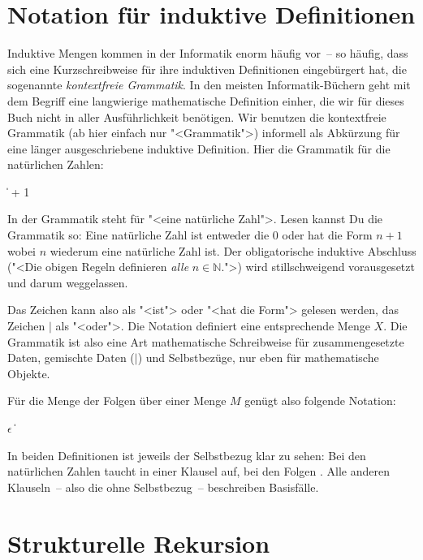 \section{Notation für induktive Definitionen}
\label{sec:grammatik}
Induktive Mengen kommen in der Informatik enorm häufig vor~-- so
häufig, dass sich eine Kurzschreibweise für ihre induktiven
Definitionen eingebürgert hat, die sogenannte \textit{kontextfreie
  Grammatik}.  In den
meisten Informatik-Büchern geht mit dem Begriff eine langwierige
mathematische Definition einher, die wir für dieses Buch nicht in aller
Ausführlichkeit benötigen.  Wir benutzen die kontextfreie Grammatik
(ab hier einfach nur "<Grammatik">) informell als Abkürzung für
eine länger ausgeschriebene induktive Definition.  Hier die Grammatik
für die natürlichen Zahlen:
%
\begin{grammar}
    \|  + 1
\end{grammar}
%
In der Grammatik steht  für "<eine natürliche
Zahl">.  Lesen kannst Du die Grammatik so: Eine natürliche Zahl ist
entweder die $0$ oder hat die Form $n + 1$ wobei $n$ wiederum eine
natürliche Zahl ist.  Der obligatorische induktive Abschluss ("<Die
obigen Regeln definieren \emph{alle} $n\in\mathbb{N}$.">) wird
stillschweigend vorausgesetzt
und darum weggelassen.  

Das Zeichen \goesto{} kann also als "<ist"> oder "<hat die Form">
gelesen werden, das Zeichen $\vert$ als "<oder">. Die Notation
 definiert eine entsprechende Menge $X$.  Die Grammatik ist
also eine Art mathematische Schreibweise für zusammengesetzte Daten,
gemischte Daten ($\vert$) und Selbstbezüge, nur eben für mathematische
Objekte.

Für die Menge der Folgen über einer Menge $M$ genügt also folgende Notation:
%
\begin{grammar}
   \: $\epsilon$ \|  
\end{grammar}
%
In beiden Definitionen ist jeweils der Selbstbezug klar zu sehen: 
Bei den natürlichen Zahlen taucht   in einer
Klausel auf, bei den Folgen .  Alle anderen Klauseln~--
also die ohne Selbstbezug~-- beschreiben Basisfälle.

\section{Strukturelle Rekursion}

